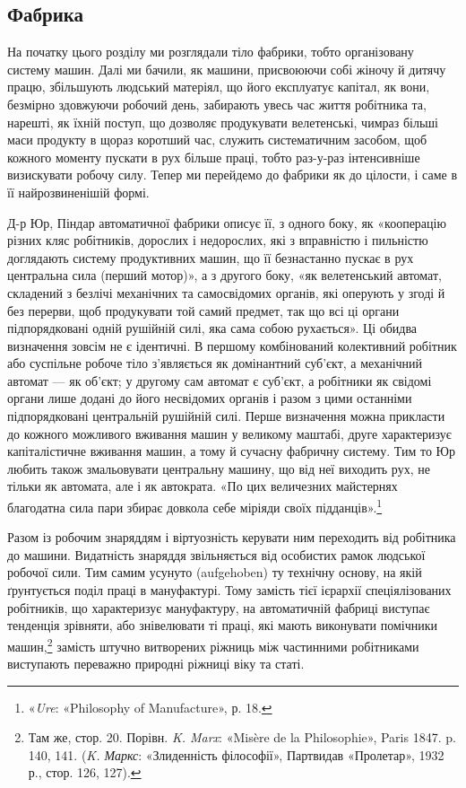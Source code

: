 \subsection{Фабрика}

На початку цього розділу ми розглядали тіло фабрики, тобто
організовану систему машин. Далі ми бачили, як машини, присвоюючи
собі жіночу й дитячу працю, збільшують людський
матеріял, що його експлуатує капітал, як вони, безмірно здовжуючи
робочий день, забирають увесь час життя робітника та,
нарешті, як їхній поступ, що дозволяє продукувати велетенські,
чимраз більші маси продукту в щораз коротший час, служить
систематичним засобом, щоб кожного моменту пускати в рух
більше праці, тобто раз-у-раз інтенсивніше визискувати робочу
силу. Тепер ми перейдемо до фабрики як до цілости, і саме в її
найрозвиненішій формі.

Д-р Юр, Піндар автоматичної фабрики описує її, з одного
боку, як «кооперацію різних кляс робітників, дорослих і недорослих,
які з вправністю і пильністю доглядають систему продуктивних
машин, що її безнастанно пускає в рух центральна
сила (перший мотор)», а з другого боку, «як велетенський автомат,
складений з безлічі механічних та самосвідомих органів,
які оперують у згоді й без перерви, щоб продукувати той самий
предмет, так що всі ці органи підпорядковані одній рушійній
силі, яка сама собою рухається». Ці обидва визначення зовсім
не є ідентичні. В першому комбінований колективний робітник
або суспільне робоче тіло з’являється як домінантний суб’єкт,
а механічний автомат — як об’єкт; у другому сам автомат є
суб’єкт, а робітники як свідомі органи лише додані до його
несвідомих органів і разом з цими останніми підпорядковані
центральній рушійній силі. Перше визначення можна прикласти
до кожного можливого вживання машин у великому маштабі,
друге характеризує капіталістичне вживання машин, а тому й
сучасну фабричну систему. Тим то Юр любить також змальовувати
центральну машину, що від неї виходить рух, не тільки як
автомата, але і як автократа. «По цих величезних майстернях
благодатна сила пари збирає довкола себе міріяди своїх підданців».\footnote{
«\emph{Ure}: «Philosophy of Manufacture», р. 18.
}

Разом із робочим знаряддям і віртуозність керувати ним
переходить від робітника до машини. Видатність знаряддя звільняється
від особистих рамок людської робочої сили. Тим самим
усунуто (aufgehoben) ту технічну основу, на якій ґрунтується
поділ праці в мануфактурі. Тому замість тієї ієрархії спеціялізованих
робітників, що характеризує мануфактуру, на автоматичній
фабриці виступає тенденція зрівняти, або знівелювати ті
праці, які мають виконувати помічники машин,\footnote{
Там же, стор. 20. Порівн. \emph{K. Marx}: «Misère de la Philosophie»,
Paris 1847. p. 140, 141. (\emph{K. Маркс}: «Злиденність філософії», Партвидав
«Пролетар», 1932 р., стор. 126, 127).
} замість штучно
витворених ріжниць між частинними робітниками виступають
переважно природні ріжниці віку та статі.

